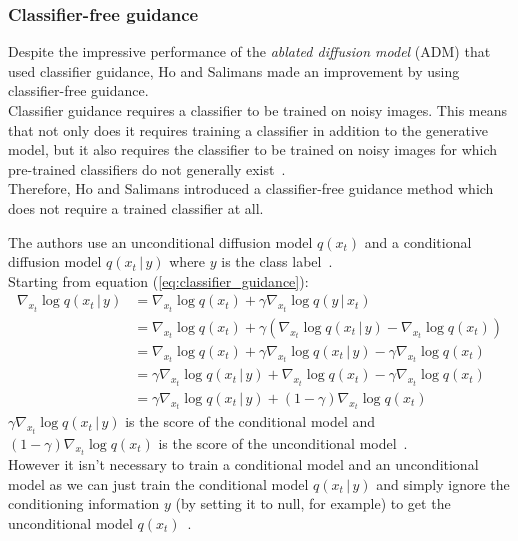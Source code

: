 \documentclass[twoside]{article}
\numberwithin{equation}{section}
\numberwithin{figure}{section}
\begin{document}
\subsubsection{Classifier-free guidance}
Despite the impressive performance of the \textit{ablated diffusion model} (ADM) that used classifier guidance, Ho and Salimans made an improvement by using classifier-free guidance. \cite{ho2022classifierfree} \\
Classifier guidance requires a classifier to be trained on noisy images. This means that not only does it requires training a classifier in addition to the generative model, but it also requires the classifier to be trained on noisy images for which pre-trained classifiers do not generally exist~\cite{ho2022classifierfree}. \\
Therefore, Ho and Salimans \cite{ho2022classifierfree} introduced a classifier-free guidance method which does not require a trained classifier at all. 

The authors use an unconditional diffusion model $q(x_t)$ and a conditional diffusion model $q(x_t \, | \, y)$ where $y$ is the class label~\cite{ho2022classifierfree, luo2022understanding}. \\
Starting from equation (\ref{eq:classifier_guidance}):
\begin{align}
  \nabla_{x_t} \log q(x_t \, | \, y) &= \nabla_{x_t} \log q(x_t) + \gamma \nabla_{x_t} \log q(y \, | \, x_t) \\
  &= \nabla_{x_t} \log q(x_t) + \gamma \left( \nabla_{x_t} \log q (x_t \, | \, y) - \nabla_{x_t} \log q(x_t) \right) \\
  &= \nabla_{x_t} \log q(x_t) + \gamma \nabla_{x_t} \log q (x_t \, | \, y) - \gamma \nabla_{x_t} \log q(x_t) \\
  &= \gamma \nabla_{x_t} \log q (x_t \, | \, y) + \nabla_{x_t} \log q(x_t) - \gamma \nabla_{x_t} \log q(x_t) \\
  &= \gamma \nabla_{x_t} \log q (x_t \, | \, y) + (1 - \gamma) \nabla_{x_t} \log q(x_t)
\end{align}
$\gamma \nabla_{x_t} \log q (x_t \, | \, y)$ is the score of the conditional model and $(1 - \gamma) \nabla_{x_t} \log q(x_t)$ is the score of the unconditional model~\cite{luo2022understanding}. \\
However it isn't necessary to train a conditional model and an unconditional model as we can just train the conditional model $q(x_t \, | \, y)$ and simply ignore the conditioning information $y$ (by setting it to null, for example) to get the unconditional model $q(x_t)$~\cite{ho2022classifierfree,luo2022understanding}. \\
\newpage
\end{document}
